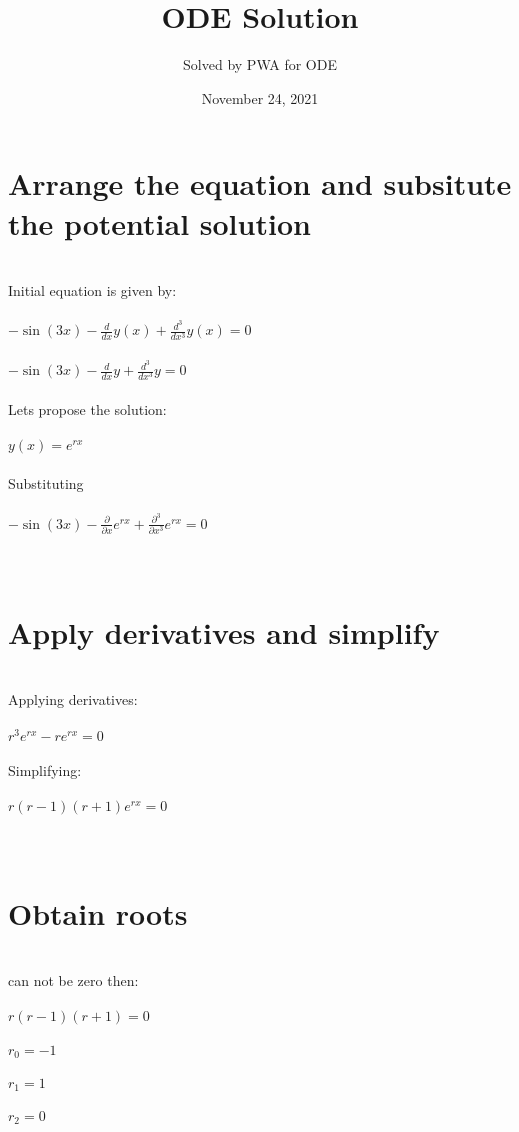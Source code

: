 \documentclass{article}
\title{ODE Solution}
\author{Solved by PWA for ODE}
\date{November 24, 2021}
\begin{document}
\maketitle
\noindent
\section{Arrange the equation and subsitute the potential solution}\\
Initial equation is given by: \\ \\$- \sin{\left(3 x \right)} - \frac{d}{d x} y{\left(x \right)} + \frac{d^{3}}{d x^{3}} y{\left(x \right)} = 0$\\ \\$- \sin{\left(3 x \right)} - \frac{d}{d x} y + \frac{d^{3}}{d x^{3}} y = 0$\\ \\Lets propose the solution: \\ \\$y(x) = e^{r x}$\\ \\Substituting\\ \\$- \sin{\left(3 x \right)} - \frac{\partial}{\partial x} e^{r x} + \frac{\partial^{3}}{\partial x^{3}} e^{r x} = 0$\\ \\\\
\section{Apply derivatives and simplify}\\
Applying derivatives: \\ \\$r^{3} e^{r x} - r e^{r x} = 0$\\ \\Simplifying: \\ \\$r \left(r - 1\right) \left(r + 1\right) e^{r x} = 0$\\ \\\\
\section{Obtain roots}\\
can not be zero then: \\ \\$r \left(r - 1\right) \left(r + 1\right) = 0$\\ \\${r}_{0} = -1$\\ \\${r}_{1} = 1$\\ \\${r}_{2} = 0$\\ \\\\
\end{document}
